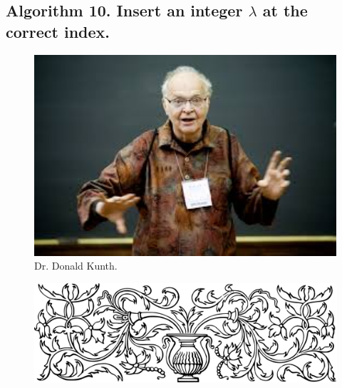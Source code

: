 \documentclass[preview]{standalone}
\begin{document}
\subsection[Insert an integer into a list.]{
    \color{section} Algorithm 10. \color{black} Insert an integer $\lambda$ at the correct index.
}
\vspace{-1\baselineskip}

\vspace{1\baselineskip}
\begin{center}
    
\end{center}
\pagebreak
\begin{center}
    
\end{center}
\vspace{1.5\baselineskip}
\begin{figure}[!h]
    \centering
    \includegraphics[width=14cm]{../resources/jpg/3.1.algorithms/kunth.jpg}
    \caption*{Dr. Donald Kunth.}
\end{figure}


\begin{figure}[!h]
    \centering
    \includegraphics[width=14cm]{../resources/jpg/3.1.algorithms/border1.png}
\end{figure}
\end{document}
